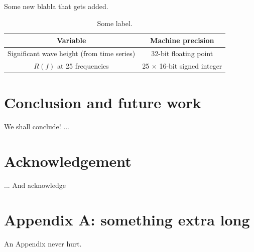 \documentclass{article}
\begin{document}
Some new blabla that gets added.

\begin{table}[h]
\begin{center}
	\begin{tabular}{c|c}
	Variable & Machine precision \\ \hline
		Significant wave height (from time series) & 32-bit floating point \\
		$R(f)$ at 25 frequencies & 25 $\times$ 16-bit signed integer 
	\end{tabular}
	\end{center}
	\caption{Some label.}
	\label{tab:tab_handle}
\end{table}

\section{Conclusion and future work}

We shall conclude! ...

\section*{Acknowledgement}

... And acknowledge

\section*{Appendix A: something extra long}

An Appendix never hurt.



\end{document}
